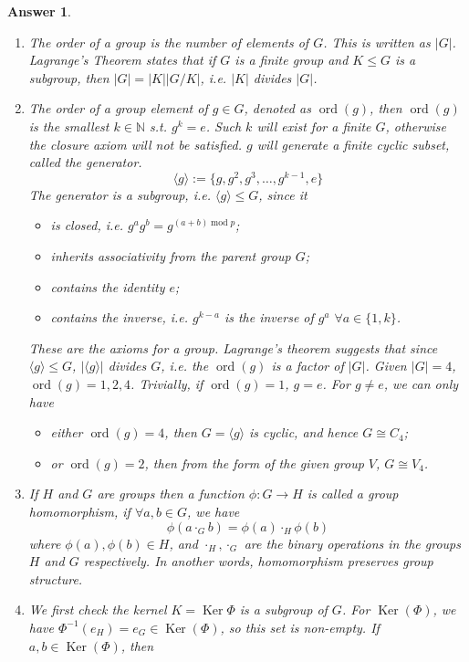 \documentclass[a4paper]{article}
\DeclareMathOperator{\modu}{ mod}
\DeclareMathOperator{\isomo}{\cong}
\DeclareMathOperator{\ord}{ord}
\DeclareMathOperator{\Ker}{Ker}
\newtheorem{ans}{Answer}[section]
\theoremstyle{new}
\begin{document}
\begin{ans}\leavevmode
\begin{enumerate}[label=(\roman*)]
\item The order of a group is the number of elements of $G$. This is written as $|G|$.\\[5pt]
Lagrange's Theorem states that if $G$ is a finite group and $K\leq G$ is a subgroup, then $|G|=|K||G/K|$, i.e. $|K|$ divides $|G|$.
\item The order of a group element of $g\in G$, denoted as $\ord(g)$, then $\ord(g)$ is the smallest $k\in\mathbb{N}$ s.t. $g^k=e$. Such $k$ will exist for a finite $G$, otherwise the closure axiom will not be satisfied. $g$ will generate a finite cyclic subset, called the generator.
$$\langle g\rangle:=\{g,g^2,g^3,\dots,g^{k-1},e\}$$
The generator is a subgroup, i.e. $\langle g\rangle\leq G$, since it 
\begin{itemize}
    \item is closed, i.e. $g^ag^b=g^{(a+b)\modu p}$;
    \item inherits associativity from the parent group $G$;
    \item contains the identity $e$;
    \item contains the inverse, i.e. $g^{k-a}$ is the inverse of $g^a$ $\forall a\in\{1,k\}$.
\end{itemize}
These are the axioms for a group. Lagrange's theorem suggests that since $\langle g\rangle\leq G$, $|\langle g\rangle|$ divides $G$, i.e. the $\ord(g)$ is a factor of $|G|$. Given $|G|=4$, $\ord(g)=1,2,4$. Trivially, if $\ord(g)=1$, $g=e$. For $g\neq e$, we can only have
\begin{itemize}
    \item either $\ord(g)=4$, then $G=\langle g\rangle$ is cyclic, and hence $G\isomo C_4$;
    \item or $\ord(g)=2$, then from the form of the given group $V$, $G\isomo V_4$.
\end{itemize}
\item If $H$ and $G$ are groups then a function $\phi: G\rightarrow H$ is called a group homomorphism, if $\forall a,b\in G$, we have $$\phi(a\cdot_G b)=\phi(a)\cdot_H\phi(b)$$
where $\phi(a),\phi(b)\in H$, and $\cdot_H,\cdot_G$ are the binary operations in the groups $H$ and $G$ respectively. In another words, homomorphism preserves group structure.
\item We first check the kernel $K=\Ker\Phi$ is a subgroup of $G$. For $\Ker(\Phi)$, we have $\Phi^{-1}(e_H)=e_G\in\Ker(\Phi)$, so this set is non-empty. If $a,b\in\Ker(\Phi)$, then

\end{enumerate}
\end{ans}
\end{document}
